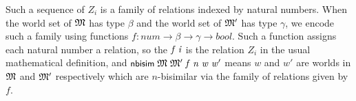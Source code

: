 \documentclass[letterpaper]{article}
\renewcommand{\HOLConst}[1]{{\textsf{\upshape\small #1}}}
\renewcommand{\HOLinline}[1]{\ensuremath{#1}}
\begin{document}
Such a sequence of $Z_i$ is a family of relations indexed by natural numbers. When the world set of \HOLinline{\HOLFreeVar{\ensuremath{\mathfrak{M}}}} has type $\beta$ and the world set of \HOLinline{\HOLFreeVar{\ensuremath{\mathfrak{M}'}}} has type $\gamma$, we encode such a family using functions $f:num\to \beta\to\gamma\to bool$. Such a function assigns each natural number a relation, so the \HOLinline{\HOLFreeVar{f}\;\HOLFreeVar{i}} is the relation $Z_i$ in the usual mathematical definition, and \HOLinline{\HOLConst{nbisim}\;\HOLFreeVar{\ensuremath{\mathfrak{M}}}\;\HOLFreeVar{\ensuremath{\mathfrak{M}'}}\;\HOLFreeVar{f}\;\HOLFreeVar{n}\;\HOLFreeVar{w}\;\HOLFreeVar{w\sp{\prime}}} means $w$ and $w'$ are worlds in \HOLinline{\HOLFreeVar{\ensuremath{\mathfrak{M}}}} and \HOLinline{\HOLFreeVar{\ensuremath{\mathfrak{M}'}}} respectively which are $n$-bisimilar via the family of relations given by $f$.
\end{document}
